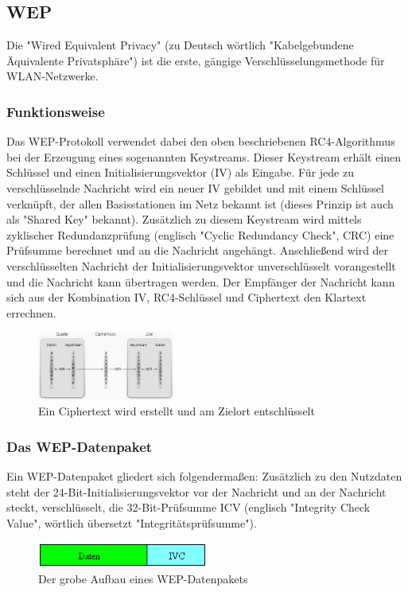 \documentclass[a4paper,13pt]{scrartcl}
\begin{document}
\subsection{WEP}
Die "Wired Equivalent Privacy" (zu Deutsch wörtlich "Kabelgebundene Äquivalente Privatsphäre") ist die erste, gängige Verschlüsselungsmethode für WLAN-Netzwerke.
\subsubsection{Funktionsweise}
Das WEP-Protokoll verwendet dabei den oben beschriebenen RC4-Algorithmus bei der Erzeugung eines sogenannten Keystreams. Dieser Keystream erhält einen Schlüssel und einen Initialisierungsvektor (IV) als Eingabe. Für jede zu verschlüsselnde Nachricht wird ein neuer IV gebildet und mit einem Schlüssel verknüpft, der allen Basisstationen im Netz bekannt ist (dieses Prinzip ist auch als "Shared Key" bekannt). Zusätzlich zu diesem Keystream wird mittels zyklischer Redundanzprüfung (englisch "Cyclic Redundancy Check", CRC) eine Prüfsumme berechnet und an die Nachricht angehängt. Anschließend wird der verschlüsselten Nachricht der Initialisierungsvektor unverschlüsselt vorangestellt und die Nachricht kann übertragen werden. Der Empfänger der Nachricht kann sich aus der Kombination IV, RC4-Schlüssel und Ciphertext den Klartext errechnen.
\begin{figure}[ht]
		\centering
	\includegraphics[width=0.4\textwidth]{WEP.eps}
		\caption{Ein Ciphertext wird erstellt und am Zielort entschlüsselt}
		\label{fig2}
\end{figure}
\subsubsection{Das WEP-Datenpaket}
Ein WEP-Datenpaket gliedert sich folgendermaßen: Zusätzlich zu den Nutzdaten steht der 24-Bit-Initialisierungsvektor vor der Nachricht und an der Nachricht steckt, verschlüsselt, die 32-Bit-Prüfsumme ICV (englisch "Integrity Check Value", wörtlich übersetzt "Integritätsprüfsumme").
\begin{figure}[ht]
		\centering
	\includegraphics[width=0.5\textwidth]{WEP_DPaket.eps}
		\caption{Der grobe Aufbau eines WEP-Datenpakets}
		\label{fig3}
\end{figure}
\end{document}
